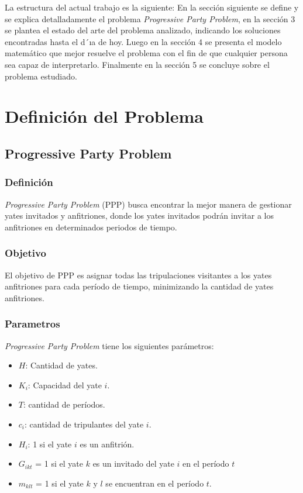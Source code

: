 \documentclass[letter, 10pt]{article}
\begin{document}
La estructura del actual trabajo es la siguiente: En la sección siguiente se define y se explica detalladamente el problema \textit{Progressive Party Problem}, en la sección 3 se plantea el estado del arte del problema analizado, indicando los soluciones encontradas hasta el d´ıa de hoy. Luego en la sección 4 se presenta el modelo matemático que mejor resuelve el problema con el fin de que cualquier persona sea capaz de interpretarlo. Finalmente en la sección 5 se concluye sobre el problema estudiado.

\section{Definición del Problema}
\subsection{Progressive Party Problem}
\subsubsection{Definición}
\textit{Progressive Party Problem} (PPP) busca encontrar la mejor manera de gestionar yates invitados y anfitriones, donde los yates invitados podrán invitar a los anfitriones en determinados periodos de tiempo. 

\subsubsection{Objetivo}
El objetivo de PPP es asignar todas las tripulaciones visitantes a los yates anfitriones para cada período de tiempo, minimizando la cantidad de yates anfitriones.

\subsubsection{Parametros}
\textit{Progressive Party Problem} tiene los siguientes parámetros:

\begin{itemize}
\item $H$: Cantidad de yates.
\item $K_i$: Capacidad del yate $i$.
\item $T$: cantidad de períodos.
\item $c_i$: cantidad de tripulantes del yate $i$.
\item $H_i$: 1 si el yate $i$ es un anfitrión.
\item $G_{ikt}$ = 1 si el yate $k$ es un invitado del yate $i$ en el período $t$
\item $m_{klt}$ = 1 si el yate $k$ y $l$ se encuentran en el período $t$.
\end{itemize}
\end{document}
